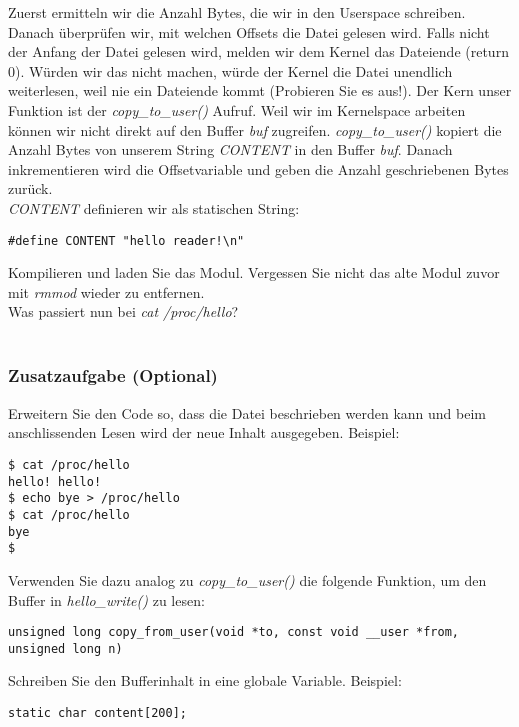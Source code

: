 Zuerst ermitteln wir die Anzahl Bytes, die wir in den Userspace schreiben. Danach überprüfen wir, mit welchen Offsets die
Datei gelesen wird. Falls nicht der Anfang der Datei gelesen wird, melden wir dem Kernel das Dateiende (return 0). Würden
wir das nicht machen, würde der Kernel die Datei unendlich weiterlesen, weil nie ein Dateiende kommt (Probieren Sie es aus!).
Der Kern unser Funktion ist der \emph{copy\_to\_user()} Aufruf. Weil wir im Kernelspace arbeiten können wir nicht direkt
auf den Buffer \emph{buf} zugreifen. \emph{copy\_to\_user()} kopiert die Anzahl Bytes von unserem String 
\emph{CONTENT} in den Buffer \emph{buf}. Danach inkrementieren wird die Offsetvariable und geben die Anzahl geschriebenen
Bytes zurück. \\

\emph{CONTENT} definieren wir als statischen String:
\begin{lstlisting}
#define CONTENT "hello reader!\n"
\end{lstlisting}

Kompilieren und laden Sie das Modul. Vergessen Sie nicht das alte Modul zuvor mit \emph{rmmod} wieder zu entfernen. \\

Was passiert nun bei \emph{cat /proc/hello}? \\

\underline{\smash{\textcolor{red}{Ausgabe: hello reader!}}\hspace{0.75\textwidth}} \\


\subsubsection{Zusatzaufgabe (Optional)}

Erweitern Sie den Code so, dass die Datei beschrieben werden kann und beim anschlissenden Lesen wird der neue
Inhalt ausgegeben. Beispiel:
\begin{lstlisting}
$ cat /proc/hello
hello! hello!
$ echo bye > /proc/hello
$ cat /proc/hello
bye
$
\end{lstlisting}

Verwenden Sie dazu analog zu \emph{copy\_to\_user()} die folgende Funktion, um den Buffer in \emph{hello\_write()} zu lesen:
\begin{lstlisting}
unsigned long copy_from_user(void *to, const void __user *from, unsigned long n)
\end{lstlisting}
Schreiben Sie den Bufferinhalt in eine globale Variable. Beispiel:
\begin{lstlisting}
static char content[200];
\end{lstlisting}
